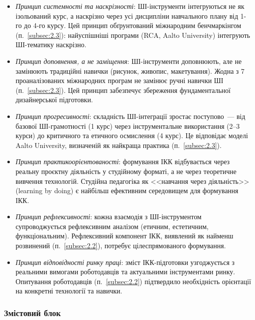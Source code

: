\begin{itemize}
    \item \textit{Принцип системності та наскрізності}: ШІ-інструменти інтегруються не як ізольований курс, а наскрізно через усі дисципліни навчального плану від 1-го до 4-го курсу. Цей принцип обґрунтований міжнародним бенчмаркінгом (п.~\ref{subsec:2.3}): найуспішніші програми (RCA, Aalto University) інтегрують ШІ-тематику наскрізно.

    \item \textit{Принцип доповнення, а не заміщення}: ШІ-інструменти доповнюють, але не замінюють традиційні навички (рисунок, живопис, макетування). Жодна з 7 проаналізованих міжнародних програм не замінює ручні навички ШІ (п.~\ref{subsec:2.3}). Цей принцип забезпечує збереження фундаментальної дизайнерської підготовки.

    \item \textit{Принцип прогресивності}: складність ШІ-інтеграції зростає поступово~--- від базової ШІ-грамотності (1 курс) через інструментальне використання (2--3 курси) до критичного та етичного осмислення (4 курс). Це відповідає моделі Aalto University, визначеній як найкраща практика (п.~\ref{subsec:2.3}).

    \item \textit{Принцип практикоорієнтованості}: формування ІКК відбувається через реальну проєктну діяльність у студійному форматі, а не через теоретичне вивчення технологій. Студійна педагогіка як <<навчання через діяльність>> (learning by doing) є найбільш ефективним середовищем для формування ІКК.

    \item \textit{Принцип рефлексивності}: кожна взаємодія з ШІ-інструментом супроводжується рефлексивним аналізом (етичним, естетичним, функціональним). Рефлексивний компонент ІКК, виявлений як найменш розвинений (п.~\ref{subsec:2.2}), потребує цілеспрямованого формування.

    \item \textit{Принцип відповідності ринку праці}: зміст ІКК-підготовки узгоджується з реальними вимогами роботодавців та актуальними інструментами ринку. Опитування роботодавців (п.~\ref{subsec:2.2}) підтвердило необхідність орієнтації на конкретні технології та навички.
\end{itemize}

\subsubsection{Змістовий блок}\label{sssec:3.1.3}

